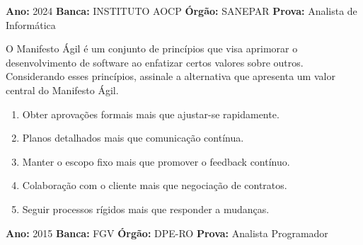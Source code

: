 \documentclass[12pt]{article}
\begin{document}
\vspace{0.2cm}
\begin{caixaResposta}
\end{caixaResposta}

\vspace{0.6cm}

\vspace{0.15cm}

\begin{metaConcurso}
\small \textbf{Ano:} 2024 \qquad \textbf{Banca:} INSTITUTO AOCP \qquad \textbf{Órgão:} SANEPAR \qquad \textbf{Prova:} Analista de Informática
\end{metaConcurso}

\vspace{0.15cm}
\noindent O Manifesto Ágil é um conjunto de princípios que visa aprimorar o desenvolvimento de software ao enfatizar certos valores sobre outros. Considerando esses princípios, assinale a alternativa que apresenta um valor central do Manifesto Ágil.

\begin{enumerate}[label=\Alph*)]
    \item Obter aprovações formais mais que ajustar-se rapidamente.
    \item Planos detalhados mais que comunicação contínua.
    \item Manter o escopo fixo mais que promover o feedback contínuo.
    \item Colaboração com o cliente mais que negociação de contratos.
    \item Seguir processos rígidos mais que responder a mudanças.
\end{enumerate}

\vspace{0.6cm}

\vspace{0.15cm}

\begin{metaConcurso}
\small \textbf{Ano:} 2015 \qquad \textbf{Banca:} FGV \qquad \textbf{Órgão:} DPE-RO \qquad \textbf{Prova:} Analista Programador
\end{metaConcurso}
\end{document}
